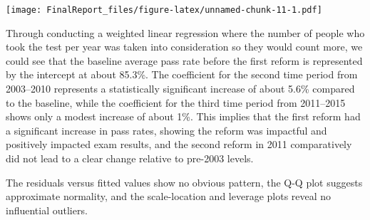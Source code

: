 \documentclass[
]{article}
\begin{document}
\texttt{[image: FinalReport\_files/figure-latex/unnamed-chunk-11-1.pdf]}

Through conducting a weighted linear regression where the number of
people who took the test per year was taken into consideration so they
would count more, we could see that the baseline average pass rate
before the first reform is represented by the intercept at about 85.3\%.
The coefficient for the second time period from 2003--2010 represents a
statistically significant increase of about 5.6\% compared to the
baseline, while the coefficient for the third time period from
2011--2015 shows only a modest increase of about 1\%. This implies that
the first reform had a significant increase in pass rates, showing the
reform was impactful and positively impacted exam results, and the
second reform in 2011 comparatively did not lead to a clear change
relative to pre-2003 levels.

The residuals versus fitted values show no obvious pattern, the Q-Q plot
suggests approximate normality, and the scale-location and leverage
plots reveal no influential outliers.
\end{document}
